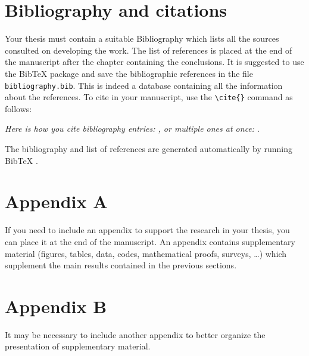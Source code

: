 \documentclass[11pt,a4paper]{article}
\begin{document}
\section{Bibliography and citations}

    Your thesis must contain a suitable Bibliography which lists all the sources consulted on developing the work. The list of references is placed at the end of the manuscript after the chapter containing the conclusions. It is suggested to use the BibTeX package and save the bibliographic references in the file \verb|bibliography.bib|. This is indeed a database containing all the information about the references. To cite in your manuscript, use the \verb|\cite{}| command as follows:

    \textit{Here is how you cite bibliography entries: \cite{knuth74}, or multiple ones at once: \cite{knuth92,lamport94}}.

    The bibliography and list of references are generated automatically by running BibTeX \cite{bibtex}.



\appendix
\section{Appendix A}

    If you need to include an appendix to support the research in your thesis, you can place it at the end of the manuscript. An appendix contains supplementary material (figures, tables, data, codes, mathematical proofs, surveys, \dots) which supplement the main results contained in the previous sections.

\section{Appendix B}

    It may be necessary to include another appendix to better organize the presentation of supplementary material.

\cleardoublepage

\end{document}
